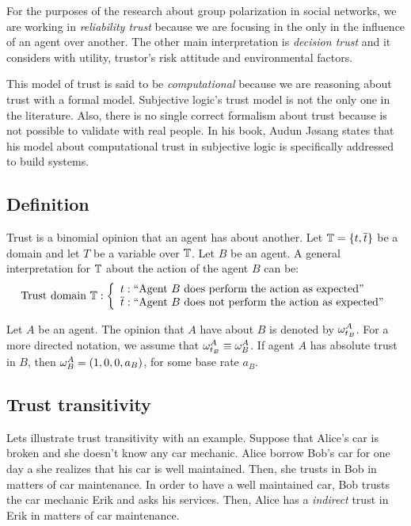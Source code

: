 \documentclass[a4paper,12pt]{article}
\theoremstyle{definition}
\numberwithin{equation}{section}
\newcommand{\qm}[1]{`#1'}
\begin{document}
For the purposes of the research about group polarization in social networks, we are working in \emph{reliability trust} because we are focusing in the only in the influence of an agent over another. The other main interpretation is \emph{decision trust} and it considers with utility, trustor's risk attitude and environmental factors.

This model of trust is said to be \emph{computational} because we are reasoning about trust with a formal model. Subjective logic's trust model is not the only one in the literature. Also, there is no single correct formalism about trust because is not possible to validate with real people. In his book, Audun Jøsang states that his model about computational trust in subjective logic is specifically addressed to build systems.

\subsection{Definition}

Trust is a binomial opinion that an agent has about another. Let $\mathbb{T} = \{t, \overline{t}\}$ be a domain and let $T$ be a variable over $\mathbb{T}$. Let $B$ be an agent. A general interpretation for $\mathbb{T}$ about the action of the agent $B$ can be:
\begin{equation}
	\text{Trust domain } \dom{T}: \left\{
	\begin{array}{l}
	t: \text{\qm{\qm{Agent $B$ does perform the action as expected}}}\\
	\overline{t}: \text{\qm{\qm{Agent $B$ does not perform the action as expected}}}
	\end{array}
	\right.
\end{equation}

Let $A$ be an agent. The opinion that $A$ have about $B$ is denoted by $\omega^{A}_{t_B}$. For a more directed notation, we assume that $\omega^{A}_{t_B} \equiv \omega^{A}_{B}$. If agent $A$ has absolute trust in $B$, then $\omega^{A}_{B} = (1, 0, 0, a_B)$, for some base rate $a_B$.

\subsection{Trust transitivity}

Lets illustrate trust transitivity with an example. Suppose that Alice's car is broken and she doesn't know any car mechanic. Alice borrow Bob's car for one day a she realizes that his car is well maintained. Then, she trusts in Bob in matters of car maintenance. In order to have a well maintained car, Bob trusts the car mechanic Erik and asks his services. Then, Alice has a \emph{indirect} trust in Erik in matters of car maintenance.
\end{document}
